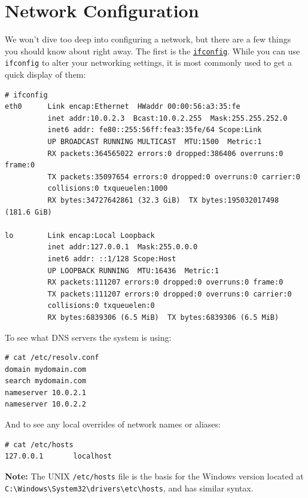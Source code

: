 \documentclass[10pt,]{book}
\numberwithin{figure}{chapter}
\begin{document}
\section{Network Configuration}\label{network-configuration}

We won't dive too deep into configuring a network, but there are a few
things you should know about right away. The first is the
\href{http://linux.die.net/man/8/ifconfig}{\texttt{ifconfig}}. While you
can use \texttt{ifconfig} to alter your networking settings, it is most
commonly used to get a quick display of them:

\begin{verbatim}
# ifconfig
eth0      Link encap:Ethernet  HWaddr 00:00:56:a3:35:fe
          inet addr:10.0.2.3  Bcast:10.0.2.255  Mask:255.255.252.0
          inet6 addr: fe80::255:56ff:fea3:35fe/64 Scope:Link
          UP BROADCAST RUNNING MULTICAST  MTU:1500  Metric:1
          RX packets:364565022 errors:0 dropped:386406 overruns:0 frame:0
          TX packets:35097654 errors:0 dropped:0 overruns:0 carrier:0
          collisions:0 txqueuelen:1000
          RX bytes:34727642861 (32.3 GiB)  TX bytes:195032017498 (181.6 GiB)

lo        Link encap:Local Loopback
          inet addr:127.0.0.1  Mask:255.0.0.0
          inet6 addr: ::1/128 Scope:Host
          UP LOOPBACK RUNNING  MTU:16436  Metric:1
          RX packets:111207 errors:0 dropped:0 overruns:0 frame:0
          TX packets:111207 errors:0 dropped:0 overruns:0 carrier:0
          collisions:0 txqueuelen:0
          RX bytes:6839306 (6.5 MiB)  TX bytes:6839306 (6.5 MiB)
\end{verbatim}

To see what DNS servers the system is using:

\begin{verbatim}
# cat /etc/resolv.conf
domain mydomain.com
search mydomain.com
nameserver 10.0.2.1
nameserver 10.0.2.2
\end{verbatim}

And to see any local overrides of network names or aliases:

\begin{verbatim}
# cat /etc/hosts
127.0.0.1       localhost
\end{verbatim}

\textbf{Note:} The UNIX \texttt{/etc/hosts} file is the basis for the
Windows version located at
\texttt{C:\textbackslash{}Windows\textbackslash{}System32\textbackslash{}drivers\textbackslash{}etc\textbackslash{}hosts},
and has similar syntax.
\end{document}
